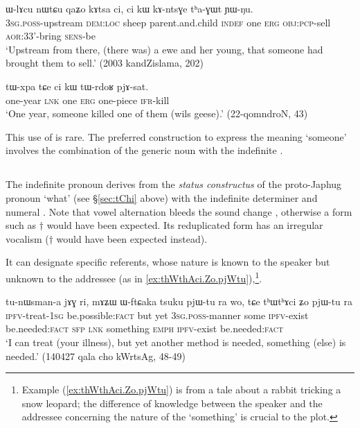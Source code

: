 \begin{exe}
\ex \label{ci.kW.thaGWt}
\gll ɯ-lɤcu nɯtɕu qaʑo kɤtsa ci, ci kɯ kɤ-ntsɣe tʰa-ɣɯt ɲɯ-ŋu. \\
\textsc{3sg}.\textsc{poss}-upstream \textsc{dem}:\textsc{loc} sheep parent.and.child \textsc{indef} one \textsc{erg} \textsc{obj}:\textsc{pcp}-sell \textsc{aor}:3\fl{}3'-bring \textsc{sens}-be \\
\glt `Upstream from there, (there was) a ewe and her young, that someone had brought them to sell.' (2003 kandZislama, 202)
\end{exe}

\begin{exe}
\ex \label{ci.kW.tWrdoR}
\gll  tɯ-xpa tɕe ci kɯ tɯ-rdoʁ pjɤ-sat. \\
 one-year \textsc{lnk} one \textsc{erg} one-piece \textsc{ifr}-kill \\
 \glt `One year, someone killed one of them (wils geese).' (22-qomndroN, 43)
\end{exe}

This use of  is rare. The preferred construction to express the meaning `someone' involves the combination of the generic noun  with the indefinite .

\subsection{ } \label{sec:thWci} 
The indefinite pronoun  derives from the \textit{status constructus} of the proto-Japhug pronoun  `what' (see §\ref{sec:tChi} above) with the indefinite determiner and numeral . Note that vowel alternation bleeds the sound change  \fl{}  , otherwise a form such as $\dagger$ would have been expected. Its reduplicated form  has an irregular vocalism  ($\dagger$ would have been expected instead).

 It can designate specific referents, whose nature is known to the speaker but unknown to the addressee (as in \ref{ex:thWthAci.Zo.pjWtu}),\footnote{Example (\ref{ex:thWthAci.Zo.pjWtu}) is from a tale about a rabbit tricking a snow leopard; the difference of knowledge between the speaker and the addressee concerning the nature of the `something' is crucial to the plot. }.

\begin{exe}
\ex  \label{ex:thWthAci.Zo.pjWtu}
\gll tu-nɯsman-a jɤɣ ri, mɤʑɯ ɯ-ftɕaka tsuku pjɯ-tu ra wo, tɕe tʰɯtʰɤci ʑo pjɯ-tu ra \\
\textsc{ipfv}-treat-\textsc{1sg} be.possible:\textsc{fact} but yet \textsc{3sg}.\textsc{poss}-manner some \textsc{ipfv}-exist be.needed:\textsc{fact} \textsc{sfp} \textsc{lnk} something \textsc{emph} \textsc{ipfv}-exist be.needed:\textsc{fact} \\
\glt `I can treat (your illness), but yet another method is needed, something (else) is needed.'  (140427 qala cho kWrtsAg, 48-49)
\end{exe}

